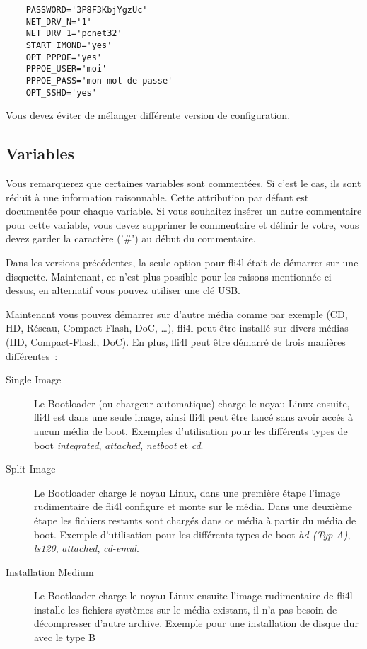 \begin{example}
\begin{verbatim}
    PASSWORD='3P8F3KbjYgzUc'
    NET_DRV_N='1'
    NET_DRV_1='pcnet32'
    START_IMOND='yes'
    OPT_PPPOE='yes'
    PPPOE_USER='moi'
    PPPOE_PASS='mon mot de passe'
    OPT_SSHD='yes'
\end{verbatim}
\end{example}

Vous devez éviter de mélanger différente version de configuration.

\subsection{Variables}

  Vous remarquerez que certaines variables sont commentées. Si c'est le cas, ils
  sont réduit à une information raisonnable. Cette attribution par défaut est
  documentée pour chaque variable. Si vous souhaitez insérer un autre commentaire
  pour cette variable, vous devez supprimer le commentaire et définir le votre,
  vous devez garder la caractère ('\#') au début du commentaire.



Dans les versions précédentes, la seule option pour fli4l était de démarrer
sur une disquette. Maintenant, ce n'est plus possible pour les raisons
mentionnée ci-dessus, en alternatif vous pouvez utiliser une clé USB.

Maintenant vous pouvez démarrer sur d'autre média comme par exemple (CD,
HD, Réseau, Compact-Flash, DoC, \ldots), fli4l peut être installé sur
divers médias (HD, Compact-Flash, DoC). En plus, fli4l peut être démarré de
trois manières différentes~:

\begin{description}
\item [Single Image] Le Bootloader (ou chargeur automatique) charge le noyau
  Linux ensuite, fli4l est dans une seule image, ainsi fli4l peut être lancé
  sans avoir accés à aucun média de boot. Exemples d'utilisation pour les
  différents types de boot \emph{integrated}, \emph{attached}, \emph{netboot} et \emph{cd}.
\item [Split Image] Le Bootloader charge le noyau Linux, dans une première étape
  l'image rudimentaire de fli4l configure et monte sur le média. Dans une
  deuxième étape les fichiers restants sont chargés dans ce média à partir
  du média de boot. Exemple d'utilisation pour les différents types
  de boot \emph{hd (Typ A)}, \emph{ls120}, \emph{attached}, \emph{cd-emul}.
\item [Installation Medium] Le Bootloader charge le noyau Linux ensuite l'image
  rudimentaire de fli4l installe les fichiers systèmes sur le média existant,
  il n'a pas besoin de décompresser d'autre archive. Exemple pour une installation
  de disque dur avec le type B
\end{description}

